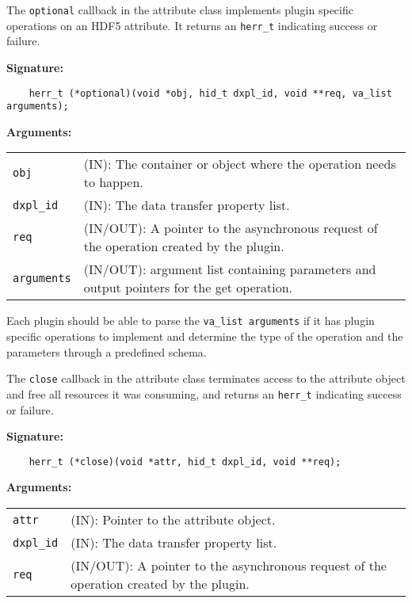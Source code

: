 The \texttt{optional} callback in the attribute class implements plugin specific operations on an HDF5 attribute. It returns an \texttt{herr\_t} indicating success or failure. \bigskip

\begin{mdframed}[style=bgbox]
\textbf{Signature:}
\begin{lstlisting}
    herr_t (*optional)(void *obj, hid_t dxpl_id, void **req, va_list arguments);
\end{lstlisting}

\textbf{Arguments:}\\
\begin{tabular}{l p{13.5cm}}
  \texttt{obj} & (IN): The container or object where the operation needs to happen.\\
  \texttt{dxpl\_id} & (IN): The data transfer property list.\\
  \texttt{req} & (IN/OUT): A pointer to the asynchronous request of the operation created by the plugin.\\
  \texttt{arguments} & (IN/OUT): argument list containing parameters and output pointers for the get operation. \\
\end{tabular}
\end{mdframed}

Each plugin should be able to parse the \texttt{va\_list arguments} if it has plugin specific operations to implement and determine the type of the operation and the parameters through a predefined schema. 

The \texttt{close} callback in the attribute class terminates
access to the attribute object and free all resources it was
consuming, and returns an \texttt{herr\_t} indicating success or failure.\bigskip

\begin{mdframed}[style=bgbox]
\textbf{Signature:}
\begin{lstlisting}
    herr_t (*close)(void *attr, hid_t dxpl_id, void **req);
\end{lstlisting}

\textbf{Arguments:}\\
\begin{tabular}{l p{13.5cm}}
  \texttt{attr} & (IN): Pointer to the attribute object.\\
  \texttt{dxpl\_id} & (IN): The data transfer property list.\\
  \texttt{req} & (IN/OUT): A pointer to the asynchronous request of the
  operation created by the plugin.\\
\end{tabular}
\end{mdframed}


